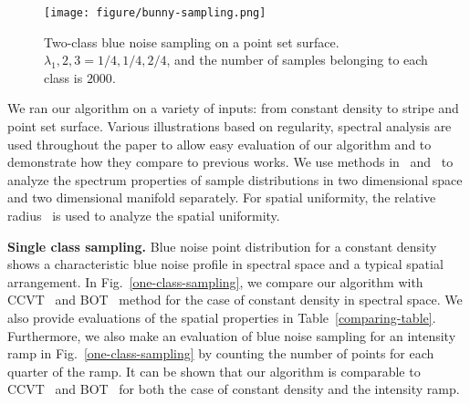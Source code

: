 \begin{figure}[htb]
  \centering
  \texttt{[image: figure/bunny-sampling.png]}
  \caption{Two-class blue noise sampling on a point set surface.
  $\lambda_1,2,3=1/4,1/4,2/4$, and the number of samples belonging to each class is $2000$.  }\label{bunny-sampling}
\end{figure}
We ran our algorithm on a variety of inputs:
from constant density to stripe and point set surface.
Various illustrations based on regularity, spectral analysis are
used throughout the paper to allow easy evaluation of our algorithm and to demonstrate how they compare to previous works.
We use methods in~\cite{schlomer:2011:accurate} and~\cite{wei:2011:differential} to analyze the
spectrum properties of sample distributions in two dimensional space and two dimensional manifold separately.
For spatial uniformity,
the relative radius~\cite{Lagae:2008:CPDD} is used to analyze the spatial uniformity.

\textbf{Single class sampling.}
Blue noise point distribution for a constant density
shows a characteristic blue noise profile in spectral space
and a typical spatial arrangement.
In Fig.~\ref{one-class-sampling},
we compare our algorithm with CCVT~\cite{balzer:2009:capacity} and BOT~\cite{de:2012:blue} method for the case of constant density in spectral space.
We also provide evaluations of the spatial properties in Table~\ref{comparing-table}.
Furthermore,
we also make an evaluation of blue noise sampling for an intensity ramp in Fig.~\ref{one-class-sampling}
by counting the number of points for each
quarter of the ramp.
It can be shown that our algorithm is comparable to CCVT~\cite{balzer:2009:capacity} and BOT~\cite{de:2012:blue} for both the case of constant density and the intensity ramp.

